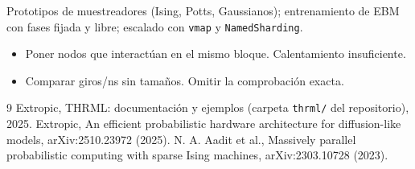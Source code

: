 \documentclass[11pt,a4paper]{article}
\begin{document}
\begin{aplicacion}
Prototipos de muestreadores (Ising, Potts, Gaussianos); entrenamiento de EBM con fases fijada y libre; escalado con \texttt{vmap} y \texttt{NamedSharding}.
\end{aplicacion}

\begin{error}
\begin{itemize}[nosep]
\item Poner nodos que interactúan en el mismo bloque. \quad Calentamiento insuficiente.
\item Comparar giros/ns sin tamaños. \quad Omitir la comprobación exacta.
\end{itemize}
\end{error}

\begin{thebibliography}{9}\small
{} Extropic, THRML: documentación y ejemplos (carpeta \texttt{thrml/} del repositorio), 2025.
 Extropic, An efficient probabilistic hardware architecture for diffusion-like models, arXiv:2510.23972 (2025).
 N. A. Aadit et al., Massively parallel probabilistic computing with sparse Ising machines, arXiv:2303.10728 (2023).
\end{thebibliography}
\end{document}
